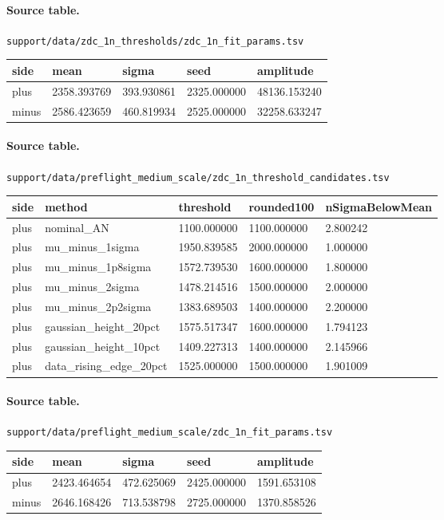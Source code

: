 \documentclass[11pt]{article}
\begin{document}
\paragraph{Source table.} \texttt{support/data/zdc\_1n\_thresholds/zdc\_1n\_fit\_params.tsv}
\begin{center}\scriptsize
\begin{tabular}{|l|l|l|l|l|}
\hline
side & mean & sigma & seed & amplitude \\ \hline
plus & 2358.393769 & 393.930861 & 2325.000000 & 48136.153240 \\ \hline
minus & 2586.423659 & 460.819934 & 2525.000000 & 32258.633247 \\ \hline
\end{tabular}
\end{center}
\paragraph{Source table.} \texttt{support/data/preflight\_medium\_scale/zdc\_1n\_threshold\_candidates.tsv}
\begin{center}\scriptsize
\begin{tabular}{|l|l|l|l|l|}
\hline
side & method & threshold & rounded100 & nSigmaBelowMean \\ \hline
plus & nominal\_AN & 1100.000000 & 1100.000000 & 2.800242 \\ \hline
plus & mu\_minus\_1sigma & 1950.839585 & 2000.000000 & 1.000000 \\ \hline
plus & mu\_minus\_1p8sigma & 1572.739530 & 1600.000000 & 1.800000 \\ \hline
plus & mu\_minus\_2sigma & 1478.214516 & 1500.000000 & 2.000000 \\ \hline
plus & mu\_minus\_2p2sigma & 1383.689503 & 1400.000000 & 2.200000 \\ \hline
plus & gaussian\_height\_20pct & 1575.517347 & 1600.000000 & 1.794123 \\ \hline
plus & gaussian\_height\_10pct & 1409.227313 & 1400.000000 & 2.145966 \\ \hline
plus & data\_rising\_edge\_20pct & 1525.000000 & 1500.000000 & 1.901009 \\ \hline
\end{tabular}
\end{center}
\paragraph{Source table.} \texttt{support/data/preflight\_medium\_scale/zdc\_1n\_fit\_params.tsv}
\begin{center}\scriptsize
\begin{tabular}{|l|l|l|l|l|}
\hline
side & mean & sigma & seed & amplitude \\ \hline
plus & 2423.464654 & 472.625069 & 2425.000000 & 1591.653108 \\ \hline
minus & 2646.168426 & 713.538798 & 2725.000000 & 1370.858526 \\ \hline
\end{tabular}
\end{center}
\end{document}
